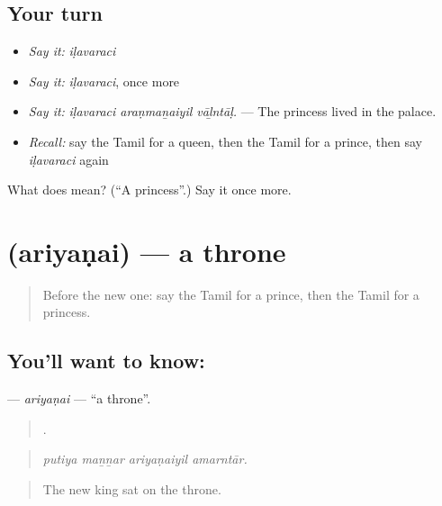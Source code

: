 \subsection*{Your turn}
\begin{itemize}
\raggedright
  \item \emph{Say it:} \emph{iḷavaraci}
  \item \emph{Say it:} \emph{iḷavaraci}, once more
  \item \emph{Say it:} \emph{iḷavaraci araṇmaṉaiyil vāḻntāḷ.} — The princess lived in the palace.
  \item \emph{Recall:} say the Tamil for a queen, then the Tamil for a prince, then say \emph{iḷavaraci} again
\end{itemize}

\begin{tcolorbox}[breakable,colback=teal!4,colframe=teal!35!black,title={Before you move on}]
What does  mean? (\textquotedblleft{}A princess\textquotedblright{}.) Say it once more.
\end{tcolorbox}
\section[\texorpdfstring{\ta{அரியணை} (ariyaṇai)}{அரியணை (ariyaṇai)}]{ (ariyaṇai) — a throne}

\label{lesson:TA-C328-ariyanai}



\begin{quote}
Before the new one: say the Tamil for a prince, then the Tamil for a princess.
\end{quote}

\subsection*{You'll want to know: }
\textbf{} — \emph{ariyaṇai} — \textquotedblleft{}a throne\textquotedblright{}.

\begin{quote}
   .
\end{quote}

\begin{quote}
\emph{putiya maṉṉar ariyaṇaiyil amarntār.}
\end{quote}

\begin{quote}
The new king sat on the throne.
\end{quote}

